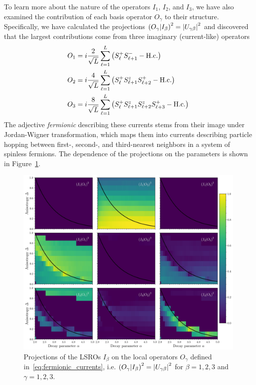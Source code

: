 To learn more about the nature of the operators \(I_1\), \(I_2\), and \(I_3\), we have also
examined the contribution of each basis operator \(O_{\gamma}\) to their structure. Specifically,
we have calculated the projections \(\left(O_{\gamma} \middle| I_{\beta}\right)^2 = \abs{U_{\gamma\beta}}^2\)
and discovered that the largest contributions come from three imaginary (current-like) operators
\begin{align}
  O_1 &= i \frac{2}{\sqrt{L}} \sum_{\ell=1}^L \left(S^{+}_{\ell} S^{-}_{\ell+1} - \textrm{H.c.}\right)\nonumber\\
  O_2 &= i \frac{4}{\sqrt{L}} \sum_{\ell=1}^L \left(S^{+}_{\ell} S^{z}_{\ell+1} S^{+}_{\ell+2} - \textrm{H.c.}\right)\nonumber\\
  O_3 &= i \frac{8}{\sqrt{L}} \sum_{\ell=1}^L \left(S^{+}_{\ell} S^{z}_{\ell+1} S^{z}_{\ell+2} S^{+}_{\ell+3} - \textrm{H.c.}\right)
  \label{eq:fermionic_currents}
\end{align}
The adjective \textit{fermionic} describing these currents stems from their image under Jordan-Wigner transformation,
which maps them into currents describing particle hopping between first-, second-, and third-nearest neighbors in a system
of spinless fermions.
The dependence of the projections on the parameters is shown in Figure~\ref{fig:projections}.

\begin{figure}[htbp]
  \centering
  \includegraphics[width=\linewidth]{Figures/projections.jpg}
  \caption{Projections of the LSROs \(I_{\beta}\) on the local operators \(O_{\gamma}\) defined in~\eqref{eq:fermionic_currents},
  i.e. \(\left(O_{\gamma} \middle| I_{\beta}\right)^2 = \abs{U_{\gamma\beta}}^2\) for \(\beta = 1,2,3\) and \(\gamma = 1,2,3\).}
  \label{fig:projections}
\end{figure}

